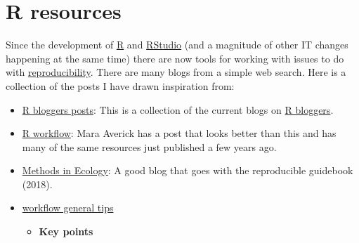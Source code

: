 \documentclass[
]{book}
\providecommand{\tightlist}{%
  \setlength{\itemsep}{0pt}\setlength{\parskip}{0pt}}
\theoremstyle{definition}
\theoremstyle{definition}
\theoremstyle{definition}
\theoremstyle{definition}
\theoremstyle{remark}
\begin{document}
\hypertarget{r-resources}{%
\chapter{R resources}\label{r-resources}}

Since the development of \href{https://cran.r-project.org/}{R} and \href{https://rstudio.com/}{RStudio} (and a magnitude of other IT changes happening at the same time) there are now tools for working with issues to do with \href{https://www.nature.com/news/1-500-scientists-lift-the-lid-on-reproducibility-1.19970}{reproducibility}. There are many blogs from a simple web search.
Here is a collection of the posts I have drawn inspiration from:

\begin{itemize}
\item
  \href{https://www.r-bloggers.com/}{R bloggers posts}: This is a collection of the current blogs on \href{https://www.r-bloggers.com}{R bloggers}.
\item
  \href{https://maraaverick.rbind.io/2017/09/r-workflow-fun/}{R workflow}: Mara Averick has a post that looks better than this and has many of the same resources just published a few years ago.
\item
  \href{https://methodsblog.com/2016/10/05/reproducibility-with-r/}{Methods in Ecology}: A good blog that goes with the reproducible guidebook (2018).
\item
  \href{https://csgillespie.github.io/efficientR/workflow.html}{workflow general tips}

  \begin{itemize}
  \tightlist
  \item
    \textbf{Key points}
  \end{itemize}


\end{itemize}
\end{document}
